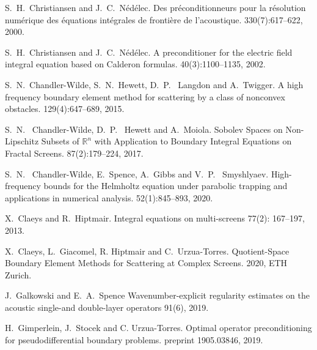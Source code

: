\documentclass[]{article}
\begin{document}
\begin{small}
\begin{thebibliography}{0}
		S.~H.~Christiansen and J.~C.~Nédélec.
		\newblock Des préconditionneurs pour la résolution numérique des équations intégrales de frontière de l'acoustique.
		  330(7):617--622, 2000.
		
		S.~H.~Christiansen and J.~C.~Nédélec.
		\newblock A preconditioner for the electric field integral equation based on Calderon formulas.
		  40(3):1100--1135, 2002.
		
		S.~N.~Chandler-Wilde, S.~N.~Hewett, D.~P.~ Langdon and A.~Twigger.
		\newblock A high frequency boundary element method for scattering by a class of nonconvex obstacles.
		 129(4):647--689, 2015.
		
		S.~N.~ Chandler-Wilde, D.~P.~ Hewett and A.~Moiola.
		\newblock Sobolev Spaces on Non-Lipschitz Subsets of ${\mathbb {R}}^n$ with Application to Boundary Integral Equations on Fractal Screens. 
		 87(2):179--224, 2017.
		
		S.~N.~ Chandler-Wilde, E.~Spence, A.~Gibbs and V.~P.~ Smyshlyaev.
		\newblock High-frequency bounds for the Helmholtz equation under parabolic trapping and applications in numerical analysis.
		52(1):845--893, 2020.	
		
		X.~Claeys and R.~Hiptmair.
		\newblock Integral equations on multi-screens
		 77(2): 167--197, 2013.
		
		X.~Claeys, L.~Giacomel, R. Hiptmair and C.~Urzua-Torres.
		\newblock Quotient-Space Boundary Element Methods for Scattering at Complex Screens.
		 2020, ETH Zurich.
		
		J.~Galkowski and E.~A.~Spence
		\newblock Wavenumber-explicit regularity estimates on the acoustic single-and double-layer operators
		91(6), 2019.
		
		H.~Gimperlein, J.~Stocek and C. Urzua-Torres.
		\newblock Optimal operator preconditioning for pseudodifferential boundary problems.
		 preprint 1905.03846, 2019.
		

\end{thebibliography}
\end{small}
\end{document}
